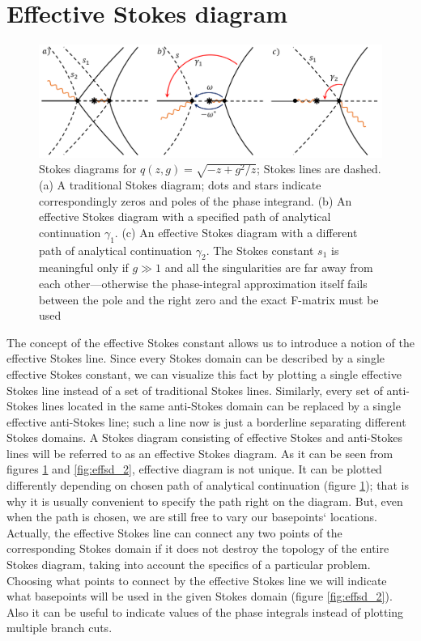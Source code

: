 \documentclass[atmp]{ipart_v1}
\newcommand\fref[1]{figure \ref{#1}}
\begin{document}
\section{Effective Stokes diagram \label{sec:effsd}}

\begin{figure}
\centering
\noindent
\includegraphics[width=\textwidth]{effsd_1.png}
\caption{
Stokes diagrams for $q(z,g)=\sqrt{-z + g^2/z}$; Stokes lines are dashed. 
(a) A traditional Stokes diagram; dots and stars indicate correspondingly zeros and poles of the phase integrand.
(b) An effective Stokes diagram with a specified path of analytical continuation $\gamma_1$. 
(c) An effective Stokes diagram with a different path of analytical continuation $\gamma_2$.
The Stokes constant $s_1$ is meaningful only if $g \gg 1$ and all the singularities are far away 
from each other---otherwise the phase-integral approximation itself fails between 
the pole and the right zero and the exact F-matrix must be used}
\label{fig:effsd_1}
\end{figure}  

The concept of the effective Stokes constant allows us to introduce a notion of the effective Stokes line.
Since every Stokes domain can be described by a single effective Stokes constant, we can visualize this fact 
by plotting a single effective Stokes line instead of a set of traditional Stokes lines. 
Similarly, every set of anti-Stokes lines located in the same anti-Stokes
domain can be replaced by a single effective anti-Stokes line; such a line now is just a borderline 
separating different Stokes domains. A Stokes diagram consisting of effective Stokes and anti-Stokes 
lines will be referred to as an effective Stokes diagram. As it can be seen from figures \ref{fig:effsd_1} 
and \ref{fig:effsd_2}, effective diagram is not unique. 
It can be plotted differently depending on chosen path of analytical 
continuation (\fref{fig:effsd_1}); that is why it is usually convenient to specify 
the path right on the diagram. But, even when the path is chosen, we
are still free to vary our basepoints` locations. Actually, the effective Stokes line can connect any two 
points of the corresponding Stokes domain if it does not destroy the topology of the entire 
Stokes diagram, taking into account the specifics of a particular problem. 
Choosing what points to connect by the effective Stokes line we will indicate what basepoints 
will be used in the given Stokes domain (\fref{fig:effsd_2}). Also it can be useful to indicate 
values of the phase integrals instead of plotting multiple branch cuts.
\end{document}
